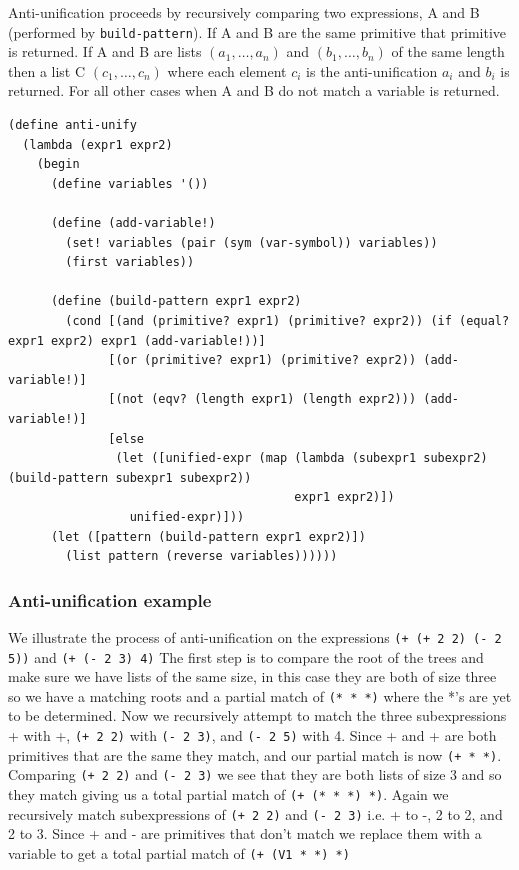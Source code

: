 \documentclass[a4paper,10pt]{article}
\begin{document}
Anti-unification proceeds by recursively comparing two expressions, A and B (performed by \texttt{build-pattern}).  If A and B are the same primitive that primitive is returned.  If A and B are lists $(a_1,\ldots,a_n)$ and $(b_1,\ldots,b_n)$ of the same length then a list C $(c_1,\ldots,c_n)$ where each element $c_i$ is the anti-unification $a_i$ and $b_i$ is returned.  For all other cases when A and B do not match a variable is returned.

\begin{lstlisting}[frame=trBL]
(define anti-unify
  (lambda (expr1 expr2)
    (begin
      (define variables '())

      (define (add-variable!)
        (set! variables (pair (sym (var-symbol)) variables))
        (first variables))
      
      (define (build-pattern expr1 expr2)
        (cond [(and (primitive? expr1) (primitive? expr2)) (if (equal? expr1 expr2) expr1 (add-variable!))]
              [(or (primitive? expr1) (primitive? expr2)) (add-variable!)]
              [(not (eqv? (length expr1) (length expr2))) (add-variable!)]
              [else
               (let ([unified-expr (map (lambda (subexpr1 subexpr2) (build-pattern subexpr1 subexpr2))
                                        expr1 expr2)])
                 unified-expr)]))
      (let ([pattern (build-pattern expr1 expr2)])
        (list pattern (reverse variables))))))
\end{lstlisting}

\subsubsection{Anti-unification example}
We illustrate the process of anti-unification on the expressions \texttt{(+ (+ 2 2) (- 2 5))} and \texttt{(+ (- 2 3) 4)}
The first step is to compare the root of the trees and make sure we have lists of the same size, in this case they are both of size three so we have a matching roots and a partial match of \texttt{(* * *)} where the *'s are yet to be determined.
Now we recursively attempt to match the three subexpressions + with +, \texttt{(+ 2 2)} with \texttt{(- 2 3)}, and \texttt{(- 2 5)} with 4.
Since + and + are both primitives that are the same they match, and our partial match is now \texttt{(+ * *)}.
Comparing \texttt{(+ 2 2)} and \texttt{(- 2 3)} we see that they are both lists of size 3 and so they match giving us a total partial match of \texttt{(+ (* * *) *)}.
Again we recursively match subexpressions of \texttt{(+ 2 2)} and \texttt{(- 2 3)} i.e. + to -, 2 to 2, and 2 to 3.
Since + and - are primitives that don't match we replace them with a variable to get a total partial match of \texttt{(+ (V1 * *) *)}
\end{document}
